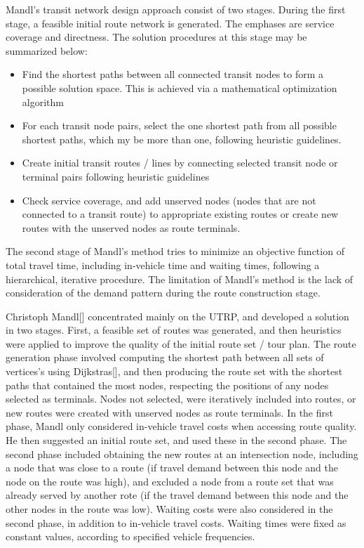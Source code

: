 Mandl's transit network design approach consist of two stages. During the first stage, a feasible initial route network is generated. The emphases are service coverage and directness. The solution procedures at this stage may be summarized below:
\begin{itemize}
\item Find the shortest paths between all connected transit nodes to form a possible solution space. This is achieved via a mathematical optimization algorithm
\item For each transit node pairs, select the one shortest path from all possible shortest paths, which my be more than one, following heuristic guidelines.
\item Create initial transit routes / lines by connecting selected transit node or terminal pairs following heuristic guidelines
\item Check service coverage, and add unserved nodes (nodes that are not connected to a transit route) to appropriate existing routes or create new routes with the unserved nodes as route terminals.
\end{itemize}

The second stage of Mandl's method tries to minimize an objective function of total travel time, including in-vehicle time and waiting times, following a hierarchical, iterative procedure. The limitation of Mandl's method is the lack of consideration of the demand pattern during the route construction stage.

\citep{zhao03}
\par
Christoph Mandl[] concentrated mainly on the UTRP, and developed a solution in two stages. First, a feasible set of routes was generated, and then heuristics were applied to improve the quality of the initial route set / tour plan. The route generation phase involved computing the shortest path between all sets of vertices's using Dijkstras[], and then producing the route set with the shortest paths that contained the most nodes, respecting the positions of any nodes selected as terminals. Nodes not selected, were iteratively included into routes, or new routes were created with unserved nodes as route terminals. In the first phase, Mandl only considered in-vehicle travel costs when accessing route quality. He then suggested an initial route set, and used these in the second phase. The second phase included obtaining the new routes at an intersection node, including a node that was close to a route (if travel demand between this node and the node on the route was high), and excluded a node from a route set that was already served by another rote (if the travel demand between this node and the other nodes in the route was low). Waiting costs were also considered in the second phase, in addition to in-vehicle travel costs. Waiting times were fixed as constant values, according to specified vehicle frequencies. 
